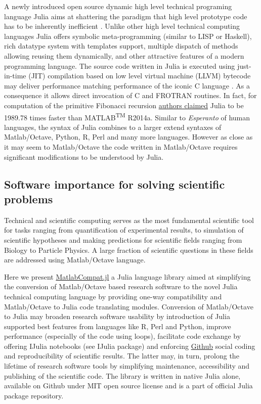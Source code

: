 A newly introduced open source dynamic high level technical programing language Julia aims at shattering the paradigm that high level prototype code has to be inherently inefficient \cite{bezanson2012julia, bezanson2014julia}.  Unlike other high level technical computing languages Julia offers symbolic meta-programming (similar to LISP or Haskell), rich datatype system with templates support, multiple dispatch of methods allowing reusing them dynamically, and other attractive features of a modern programming language. The source code written in Julia is executed using just-in-time (JIT) compilation based on low level virtual machine (LLVM) \cite{Lattner_2004} bytecode may deliver performance matching performance of the iconic C language \cite{bezanson2012julia, bezanson2014julia}. As a consequence it allows direct invocation of C and FROTRAN routines. In fact, for computation of the primitive Fibonacci recursion \href{http://julialang.org/benchmarks/}{authors claimed} Julia to be 1989.78 times faster than MATLAB\textsuperscript{TM} R2014a. Similar to \textit{Esperanto} of human languages, the syntax of Julia combines to a larger extend syntaxes of Matlab/Octave, Python, R, Perl and many more languages. However as close as it may seem to Matlab/Octave the code written in Matlab/Octave requires significant modifications to be understood by Julia.

\subsection{Software importance for solving scientific problems}

Technical and scientific computing serves as the most fundamental scientific tool for tasks ranging from quantification of experimental results, to simulation of scientific hypotheses and making predictions for scientific fields ranging from Biology to Particle Physics. A large fraction of scientific questions in these fields are addressed using Matlab/Octave language.

Here we present \href{https://github.com/MatlabCompat/MatlabCompat.jl}{MatlabCompat.jl} a Julia language library aimed at simplifying the conversion of Matlab/Octave based research software to the novel Julia technical computing language by providing one-way compatibility and Matlab/Octave to Julia code translating modules. Conversion of Matlab/Octave to Julia may broaden research software usability by introduction of Julia supported best features from languages like R, Perl and Python, improve performance (especially of the code using loops), facilitate code exchange by offering IJulia notebooks (see IJulia package) and enforcing \href{http://github.com}{Github} social coding  and reproducibility of scientific results. The latter may, in turn, prolong the lifetime of research software tools by simplifying maintenance, accessibility and publishing of the scientific code. The library is written in native Julia alone, available on Github under MIT open source license and is a part of official Julia package repository.

